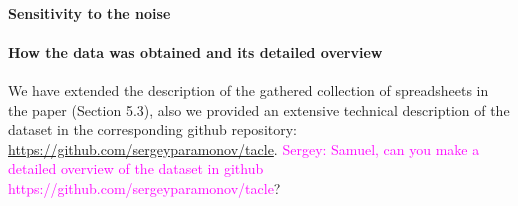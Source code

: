 \documentclass{article}
\newcommand{\sergey}[1]{\textcolor{magenta}{{\sc Sergey:} #1}\xspace}
\begin{document}
\paragraph{Sensitivity to the noise}

\paragraph{How the data was obtained and its detailed overview}
We have extended the description of the gathered collection of spreadsheets in the paper (Section 5.3), also we provided an extensive technical description of the dataset in the corresponding github repository: \url{https://github.com/sergeyparamonov/tacle}.
\sergey{Samuel, can you make a detailed overview of the dataset in github https://github.com/sergeyparamonov/tacle}?
\end{document}
